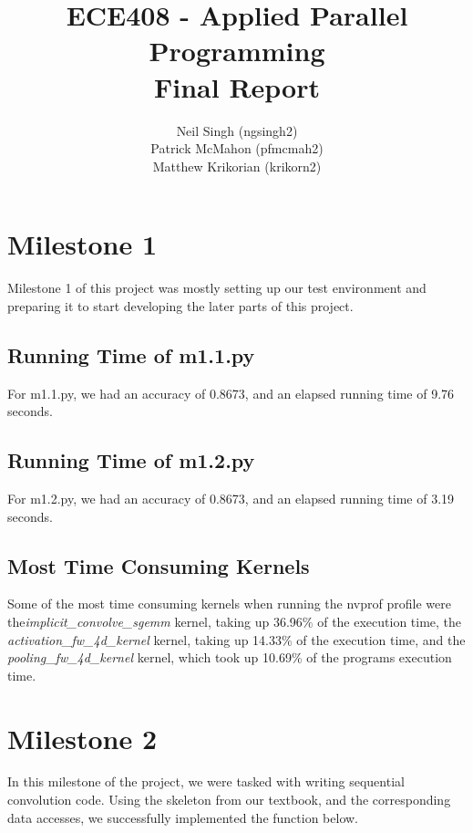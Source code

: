 \documentclass[titlepage]{article}
\title{ECE408 - Applied Parallel Programming \\ Final Report}
\author{Neil Singh (ngsingh2) \\ Patrick McMahon (pfmcmah2) \\ Matthew Krikorian (krikorn2)}
\begin{document}
\maketitle

\section*{Milestone 1}
Milestone 1 of this project was mostly setting up our test environment and preparing it to start developing the later parts of this project. 

\subsection*{Running Time of m1.1.py}
For m1.1.py, we had an accuracy of 0.8673, and an elapsed running time of 9.76 seconds.

\subsection*{Running Time of m1.2.py}
For m1.2.py, we had an accuracy of 0.8673, and an elapsed running time of 3.19 seconds.

\subsection*{Most Time Consuming Kernels}
Some of the most time consuming kernels when running the nvprof profile were the\textit{implicit\_convolve\_sgemm} kernel, taking up 36.96\% of the execution time, the \textit{activation\_fw\_4d\_kernel} kernel, taking up 14.33\% of the execution time, and the \textit{pooling\_fw\_4d\_kernel} kernel, which took up 10.69\% of the programs execution time.

\newpage

\section*{Milestone 2}
In this milestone of the project, we were tasked with writing sequential convolution code. Using the skeleton from our textbook, and the corresponding data accesses, we successfully implemented the function below.
\end{document}
